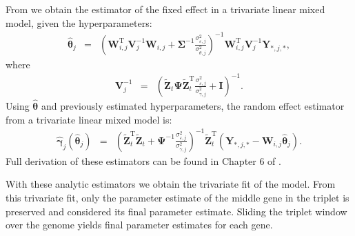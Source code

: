  
From \cite{Sorensen2002} we obtain the estimator of the fixed effect in a trivariate linear mixed model, given the hyperparameters:
\begin{eqnarray*}
\boldsymbol{\hat{\theta}}_j & = & \left( \mathbf{W}_{i,j}^\mathrm{T}\mathbf{V}_j^{-1}\mathbf{W}_{i,j} + \mathbf{\Sigma}^{-1}\frac{\sigma_{\varepsilon,j}^2}{\sigma_{\theta,j}^2} \right)^{-1} \mathbf{W}_{i,j}^\mathrm{T}\mathbf{V}_j^{-1}\mathbf{Y}_{*,j,*},
\end{eqnarray*}
where
\begin{eqnarray*}
\mathbf{V}_j^{-1} & = & \left( \tilde{\mathbf{Z}}_t\mathbf{\Psi} \tilde{\mathbf{Z}}_t^\mathrm{T}\frac{\sigma_{\varepsilon,j}^2}{\sigma_{\gamma,j}^2}+\mathbf{I} \right)^{-1}.
\end{eqnarray*}
Using $\boldsymbol{\hat{\theta}}$ and previously estimated hyperparameters, the random effect estimator from a trivariate linear mixed model is:
\begin{eqnarray*}
\boldsymbol{\hat{\gamma}}_j(\boldsymbol{\hat{\theta}}_j) & = & \left( \tilde{\mathbf{Z}}_t^\mathrm{T}\tilde{\mathbf{Z}}_t + \mathbf{\Psi}^{-1}\frac{\sigma_{\varepsilon,j}^2}{\sigma_{\gamma,j}^2}\right)^{-1} \tilde{\mathbf{Z}}_t^\mathrm{T}
\left( \mathbf{Y}_{*,j,*}-\mathbf{W}_{i,j}\boldsymbol{\hat{\theta}}_j \right).
\end{eqnarray*}
Full derivation of these estimators can be found in Chapter 6 of \cite{Sorensen2002}. 

With these analytic estimators we obtain the trivariate fit of the model. From this trivariate fit, only the parameter estimate of the middle gene in the triplet is preserved and considered its final parameter estimate. Sliding the triplet window over the genome yields final parameter estimates for each gene.




\newpage
